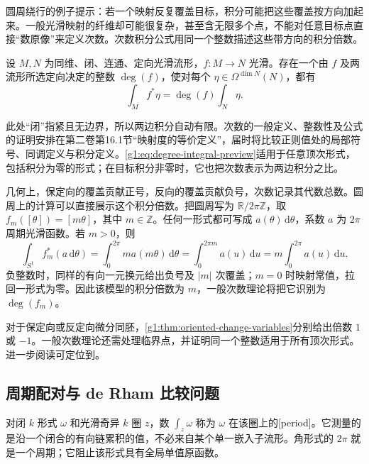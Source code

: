 圆周绕行的例子提示：若一个映射反复覆盖目标，积分可能把这些覆盖按方向加起来。一般光滑映射的纤维却可能很复杂，甚至含无限多个点，不能对任意目标点直接“数原像”来定义次数。次数积分公式用同一个整数描述这些带方向的积分倍数。

\begin{theorem}
	\label{g1:thm:degree-integral-preview}
	设 \(M,N\) 为同维、闭、连通、定向光滑流形，\(f:M\to N\) 光滑。存在一个由 \(f\) 及两流形所选定向决定的整数 \(\deg(f)\)，使对每个 \(\eta\in\Omega^{\dim N}(N)\)，都有
	\begin{equation}\label{g1:eq:degree-integral-preview}
		\int_M f^*\eta=\deg(f)\int_N\eta.
	\end{equation}
\end{theorem}

此处“闭”指紧且无边界，所以两边积分自动有限。次数的一般定义、整数性及公式的证明安排在第二卷第16.1节“映射度的等价定义”，届时将比较正则值处的局部符号、同调定义与积分定义。\eqref{g1:eq:degree-integral-preview}适用于任意顶次形式，包括积分为零的形式；在目标积分非零时，它也把次数表示为两边积分之比。

\ProseParagraphBreak

几何上，保定向的覆盖贡献正号，反向的覆盖贡献负号，次数记录其代数总数。圆周上的计算可以直接展示这个积分倍数。把圆周写为 \(\mathbb R/2\pi\mathbb Z\)，取 \(f_m([\theta])=[m\theta]\)，其中 \(m\in\mathbb Z\)。任何一形式都可写成 \(a(\theta)\,\mathrm{d}\theta\)，系数 \(a\) 为 \(2\pi\) 周期光滑函数。若 \(m>0\)，则
\[
	\int_{S^1}f_m^*(a\,\mathrm{d}\theta)
	=\int_0^{2\pi}m a(m\theta)\,\mathrm{d}\theta
	=\int_0^{2\pi m}a(u)\,\mathrm{d}u
	=m\int_0^{2\pi}a(u)\,\mathrm{d}u.
\]
负整数时，同样的有向一元换元给出负号及 \(|m|\) 次覆盖；\(m=0\) 时映射常值，拉回一形式为零。因此该模型的积分倍数为 \(m\)，一般次数理论将把它识别为 \(\deg(f_m)\)。

\ProseParagraphBreak

对于保定向或反定向微分同胚，\cref{g1:thm:oriented-change-variables}分别给出倍数 \(1\) 或 \(-1\)。一般次数理论还需处理临界点，并证明同一个整数适用于所有顶次形式。进一步阅读可定位到\cite[第17章, Degree Theory, 第457--459页]{Lee2012Smooth}。

\subsection{周期配对与 de Rham 比较问题}
\label{g1:subsec:1405:04}

对闭 \(k\) 形式 \(\omega\) 和光滑奇异 \(k\) 圈 \(z\)，数 \(\int_z\omega\) 称为 \(\omega\) 在该圈上的[period]。它测量的是沿一个闭合的有向链累积的值，不必来自某个单一嵌入子流形。角形式的 \(2\pi\) 就是一个周期；它阻止该形式具有全局单值原函数。

